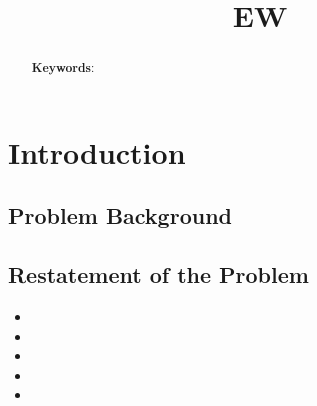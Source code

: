 \documentclass[12pt]{article}
\title{EW}
\begin{document}
\begin{abstract}
    

    \vspace{5pt}
    \textbf{Keywords}:

\end{abstract}

\maketitle %

\tableofcontents %
 
 

\section{Introduction}

\subsection{Problem Background}


\subsection{Restatement of the Problem}

\begin{itemize}
   \item 
   \item 
   \item 
   \item 
   \item 
\end{itemize}




\section{}
\end{document}
